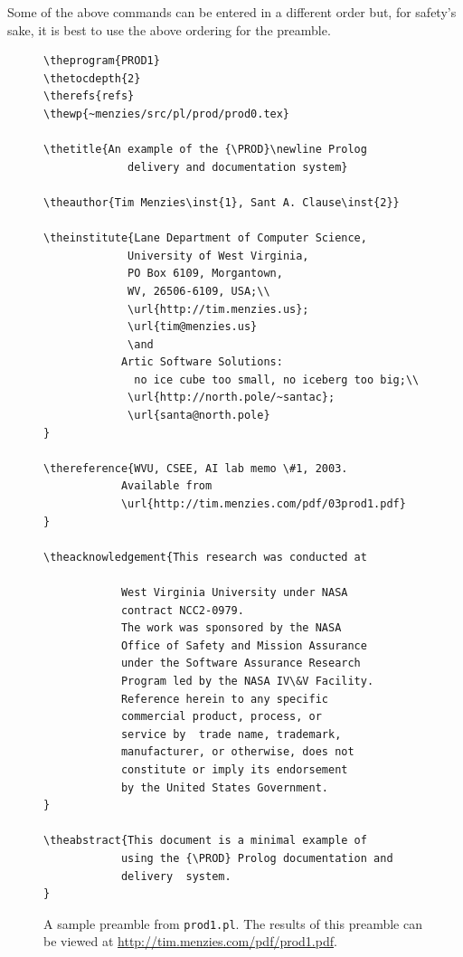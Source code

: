 Some of the above commands can be entered in a different order
but, for safety's sake, it is best to use the above ordering for
the preamble.

\begin{figure}
{\scriptsize \begin{verbatim}
\theprogram{PROD1}
\thetocdepth{2}
\therefs{refs}
\thewp{~menzies/src/pl/prod/prod0.tex}

\thetitle{An example of the {\PROD}\newline Prolog
             delivery and documentation system}

\theauthor{Tim Menzies\inst{1}, Sant A. Clause\inst{2}}

\theinstitute{Lane Department of Computer Science,
             University of West Virginia,
             PO Box 6109, Morgantown,
             WV, 26506-6109, USA;\\
             \url{http://tim.menzies.us};
             \url{tim@menzies.us}
             \and
            Artic Software Solutions:
              no ice cube too small, no iceberg too big;\\
             \url{http://north.pole/~santac};
             \url{santa@north.pole}
}

\thereference{WVU, CSEE, AI lab memo \#1, 2003.
            Available from
            \url{http://tim.menzies.com/pdf/03prod1.pdf}
}

\theacknowledgement{This research was conducted at

            West Virginia University under NASA
            contract NCC2-0979.
            The work was sponsored by the NASA
            Office of Safety and Mission Assurance
            under the Software Assurance Research
            Program led by the NASA IV\&V Facility.
            Reference herein to any specific
            commercial product, process, or
            service by  trade name, trademark,
            manufacturer, or otherwise, does not
            constitute or imply its endorsement
            by the United States Government.
}

\theabstract{This document is a minimal example of
            using the {\PROD} Prolog documentation and
            delivery  system.
}

\end{verbatim}}
\caption[A sample {\PROD} preamble.]{A sample {\PROD} preamble from {\tt prod1.pl}. The results
of this preamble can be viewed at
\protect\url{http://tim.menzies.com/pdf/prod1.pdf}.}\label{fig:samplepreamble}
\end{figure}

